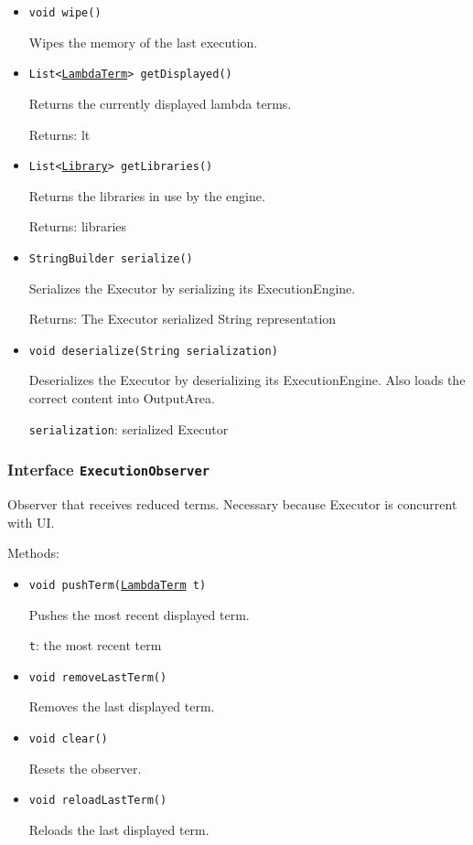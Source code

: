 \begin{itemize}
\item \texttt{void wipe()}

Wipes the memory of the last execution.

\item \texttt{List<\hyperref[type:edu.kit.wavelength.client.model.term.LambdaTerm]{LambdaTerm}> getDisplayed()}

Returns the currently displayed lambda terms.

Returns: lt

\item \texttt{List<\hyperref[type:edu.kit.wavelength.client.model.library.Library]{Library}> getLibraries()}

Returns the libraries in use by the engine.

Returns: libraries

\item \texttt{StringBuilder serialize()}

Serializes the Executor by serializing its ExecutionEngine.

Returns: The Executor serialized String representation

\item \texttt{void deserialize(String serialization)}

Deserializes the Executor by deserializing its ExecutionEngine. Also loads
 the correct content into OutputArea.

\texttt{serialization}: serialized Executor

\end{itemize}

\subsubsection{Interface \texttt{ExecutionObserver}}
\label{type:edu.kit.wavelength.client.view.execution.ExecutionObserver}
Observer that receives reduced terms. Necessary because Executor is
 concurrent with UI.

Methods:
\begin{itemize}
\item \texttt{void pushTerm(\hyperref[type:edu.kit.wavelength.client.model.term.LambdaTerm]{LambdaTerm} t)}

Pushes the most recent displayed term.

\texttt{t}: the most recent term

\item \texttt{void removeLastTerm()}

Removes the last displayed term.

\item \texttt{void clear()}

Resets the observer.

\item \texttt{void reloadLastTerm()}

Reloads the last displayed term.

\end{itemize}

